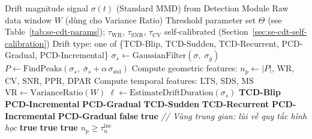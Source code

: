\begin{algorithm}[H]
	\caption{SE-CDT --- Unsupervised Drift Type Classification}
	\label{alg:se-cdt}
	\begin{algorithmic}[1]
		\Require Drift magnitude signal $\sigma(t)$ (Standard MMD) from Detection Module
		\Require Raw data window $W$ (dùng cho Variance Ratio)
		\Require Threshold parameter set $\Theta$ (see Table~\ref{tab:se-cdt-params}); $\tau_{\mathrm{WR}}$, $\tau_{\mathrm{SNR}}$, $\tau_{\mathrm{CV}}$ self-calibrated (Section~\ref{sec:se-cdt-self-calibration})
		\Ensure Drift type: one of \{TCD-Blip, TCD-Sudden, TCD-Recurrent, PCD-Gradual, PCD-Incremental\}
		\State $\sigma_s \leftarrow \text{GaussianFilter}(\sigma,\; \sigma_g)$ 
		\State $P \leftarrow \text{FindPeaks}(\sigma_s,\; \bar{\sigma}_s + \alpha\,\sigma_{\mathrm{std}})$
		\State Compute geometric features: $n_p \leftarrow |P|$, WR, CV, SNR, PPR, DPAR
		\State Compute temporal features: LTS, SDS, MS
		\State $\mathrm{VR} \leftarrow \text{VarianceRatio}(W)$ 
		\State $\ell \leftarrow \text{EstimateDriftDuration}(\sigma_s)$ 
			\Return \textbf{TCD-Blip}
		\EndIf
		\If{$\ell > \tau_{\ell}$} 
				\Return \textbf{PCD-Incremental}
			\Else
				\Return \textbf{PCD-Gradual}
			\EndIf
		\EndIf
			\Return \textbf{TCD-Sudden}
		\EndIf
			\Return \textbf{TCD-Recurrent}
		\EndIf
		 
			\Return \textbf{PCD-Incremental}
		\Else
			\Return \textbf{PCD-Gradual} 
		\EndIf
		\Statex
			 \Return \textbf{false}  \EndIf
			 \Return \textbf{true}  \EndIf
			\Statex \hspace{1.2em}\textit{// Vùng trung gian: lùi về quy tắc hình học}
			 \Return \textbf{true} \EndIf
			 \Return \textbf{true} \EndIf
			 \Return \textbf{true} \EndIf
			\Return $n_p \geq \tau_{n}^{\mathrm{inc}}$
		\EndFunction
	\end{algorithmic}
\end{algorithm}

